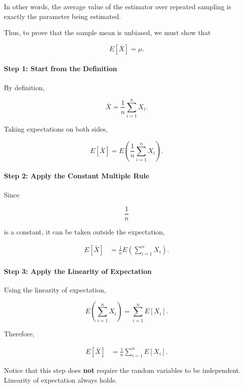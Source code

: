 \documentclass[11pt]{article}
\begin{document}
\begin{mdframed}[
		linewidth=0.8pt,
		roundcorner=6pt,
		backgroundcolor=gray!5,
		linecolor=gray!60,
		innertopmargin=10pt,
		innerbottommargin=10pt,
		innerleftmargin=10pt,
		innerrightmargin=10pt
		]
		In other words, the average value of the estimator over repeated sampling is
		exactly the parameter being estimated.
		
		Thus, to prove that the sample mean is unbiased, we must show that
		
		\[
		E[\bar X]
		=
		\mu.
		\]
		
		\bigskip
		
		\paragraph{Step 1: Start from the Definition}
		
		By definition,
		
		\[
		\bar X
		=
		\frac1n
		\sum_{i=1}^{n}X_i.
		\]
		
		Taking expectations on both sides,
		
		\[
		E[\bar X]
		=
		E\!\left(
		\frac1n
		\sum_{i=1}^{n}X_i
		\right).
		\]
		
		\bigskip
		
		\paragraph{Step 2: Apply the Constant Multiple Rule}
		
		Since
		
		\[
		\frac1n
		\]
		
		is a constant, it can be taken outside the expectation,
		
		\[
		\begin{aligned}
			E[\bar X]
			&=
			\frac1n
			E\!\left(
			\sum_{i=1}^{n}X_i
			\right).
		\end{aligned}
		\]
		
		\bigskip
		
		\paragraph{Step 3: Apply the Linearity of Expectation}
		
		Using the linearity of expectation,
		
		\[
		E\!\left(
		\sum_{i=1}^{n}X_i
		\right)
		=
		\sum_{i=1}^{n}E[X_i].
		\]
		
		Therefore,
		
		\[
		\begin{aligned}
			E[\bar X]
			&=
			\frac1n
			\sum_{i=1}^{n}E[X_i].
		\end{aligned}
		\]
		
		Notice that this step does \textbf{not} require the random variables to be
		independent. Linearity of expectation always holds.
		

\end{mdframed}
\end{document}
